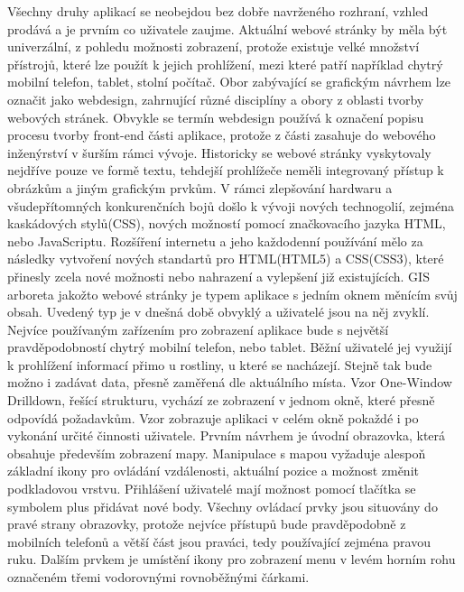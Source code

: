 \documentclass[12pt]{article}%
\begin{document}
{{\newpage
{}
Všechny druhy aplikací se neobejdou bez dobře navrženého rozhraní, vzhled prodává a je prvním co 
uživatele zaujme. Aktuální webové stránky by měla být univerzální, z pohledu možnosti zobrazení, 
protože existuje velké množství přístrojů, které lze použít k jejich prohlížení, mezi které patří 
například chytrý mobilní telefon, tablet, stolní počítač. Obor zabývající se grafickým návrhem lze 
označit jako webdesign, zahrnující různé disciplíny a obory z oblasti tvorby webových stránek. 
Obvykle se termín webdesign používá k označení popisu procesu tvorby front-end části aplikace, 
protože z části zasahuje do webového inženýrství v šurším rámci vývoje. Historicky se webové stránky
vyskytovaly nejdříve pouze ve formě textu, tehdejší prohlížeče neměli integrovaný přístup k obrázkům
a jiným grafickým prvkům. V rámci zlepšování hardwaru a všudepřítomných konkurenčních bojů došlo 
k vývoji nových technogolií, zejména kaskádových stylů(CSS), nových možností pomocí značkovacího 
jazyka HTML, nebo JavaScriptu. Rozšíření internetu a jeho každodenní používání mělo za následky 
vytvoření nových standartů pro HTML(HTML5) a CSS(CSS3), které přinesly zcela nové možnosti nebo
nahrazení a vylepšení již existujících.
GIS arboreta jakožto webové stránky je typem aplikace s jedním oknem měnícím svůj obsah. Uvedený typ
je v dnešná době obvyklý a uživatelé jsou na něj zvyklí. Nejvíce používaným zařízením pro zobrazení 
aplikace bude s největší pravděpodobností chytrý mobilní telefon, nebo tablet. Běžní uživatelé jej 
využijí k prohlížení informací přimo u rostliny, u které se nacházejí. Stejně tak bude možno 
i zadávat data, přesně zaměřená dle aktuálního místa. Vzor One-Window Drilldown, řešící strukturu, 
vychází ze zobrazení v jednom okně, které přesně odpovídá požadavkům. Vzor zobrazuje aplikaci 
v celém okně pokaždé i po vykonání určité činnosti uživatele.
Prvním návrhem je úvodní obrazovka, která obsahuje především zobrazení mapy. Manipulace s mapou 
vyžaduje alespoň základní ikony pro ovládání vzdálenosti, aktuální pozice a možnost změnit 
podkladovou vrstvu. Přihlášení uživatelé mají možnost pomocí tlačítka se symbolem plus přidávat nové 
body. Všechny ovládací prvky jsou situovány do pravé strany obrazovky, protože nejvíce přístupů bude 
pravděpodobně z mobilních telefonů a větší část jsou praváci, tedy používající zejména pravou ruku.
Dalším prvkem je umístění ikony pro zobrazení menu v levém horním rohu označeném třemi vodorovnými
rovnoběžnými čárkami.

\newpage
\obrazek
{}

}}
\end{document}
